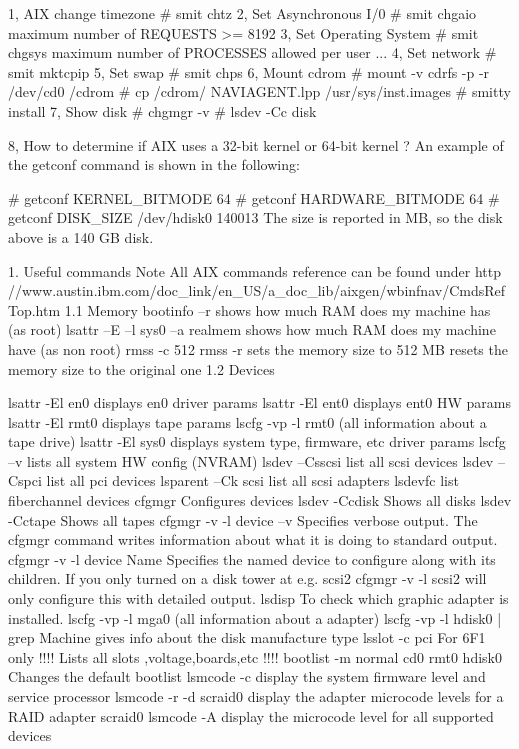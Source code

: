 1, AIX change timezone
# smit chtz
2, Set Asynchronous I/0 
# smit chgaio
maximum number of REQUESTS >= 8192
3, Set Operating System
# smit chgsys
maximum number of PROCESSES allowed per user ...
4, Set network
# smit mktcpip
5, Set swap
# smit chps
6, Mount cdrom
# mount -v cdrfs -p -r /dev/cd0 /cdrom
# cp /cdrom/ NAVIAGENT.lpp /usr/sys/inst.images
# smitty install
7, Show disk
# chgmgr -v
# lsdev -Cc disk 


8, How to determine if AIX uses a 32-bit kernel or 64-bit kernel ? 
An example of the getconf command is shown in the following:

# getconf KERNEL_BITMODE
64
# getconf HARDWARE_BITMODE
64
# getconf DISK_SIZE /dev/hdisk0
140013
The size is reported in MB, so the disk above is a 140 GB disk.






1.    Useful commands
Note  All AIX commands reference can be found under  
http //www.austin.ibm.com/doc_link/en_US/a_doc_lib/aixgen/wbinfnav/CmdsRefTop.htm
1.1    Memory
bootinfo –r    shows how much RAM does my machine has (as root)
lsattr –E –l sys0 –a realmem   shows how much RAM does my machine have (as non root)
rmss -c 512
rmss -r        sets the memory size to 512 MB
resets the memory size to the original one
1.2    Devices

lsattr  -El  en0    displays en0 driver params
lsattr  -El  ent0    displays ent0 HW params
lsattr -El rmt0    displays tape params
lscfg -vp -l rmt0    (all information about a tape drive)
lsattr  -El  sys0    displays system type, firmware, etc  driver params
lscfg –v    lists all system HW config (NVRAM)
lsdev –Csscsi    list all scsi devices
lsdev –Cspci    list all pci devices
lsparent –Ck scsi    list all scsi adapters
lsdevfc    list fiberchannel devices
cfgmgr    Configures devices
lsdev -Ccdisk     Shows all disks
lsdev -Cctape              Shows all tapes
cfgmgr -v -l device –v   Specifies verbose output. The cfgmgr command writes information about what it is doing to standard output.
cfgmgr -v -l device      Name Specifies the named device to configure along with its children.
If you only turned on a disk tower at e.g. scsi2 cfgmgr -v -l scsi2 will only configure this with detailed output.
lsdisp    To check which graphic adapter is installed.
lscfg -vp -l mga0     (all information about a adapter)
lscfg -vp -l hdisk0 | grep Machine    gives info about the disk manufacture type
lsslot -c pci    For 6F1 only !!!! Lists all slots ,voltage,boards,etc !!!!
bootlist -m normal cd0  rmt0 hdisk0   Changes the default bootlist
lsmcode -c    display the system firmware level and service processor
lsmcode -r -d scraid0    display the adapter microcode levels for a RAID adapter scraid0
lsmcode -A    display the microcode level for all supported devices
    

